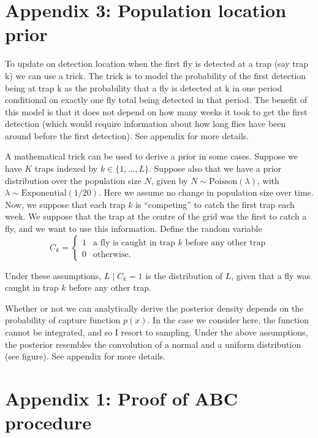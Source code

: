 \documentclass[
]{book}
\begin{document}
\hypertarget{appendix-3-population-location-prior}{%
\chapter{Appendix 3: Population location prior}\label{appendix-3-population-location-prior}}

To update on detection location when the first fly is detected at a trap (say trap k) we can use a trick. The trick is to model the probability of the first detection being at trap k as the probability that a fly is detected at k in one period conditional on exactly one fly total being detected in that period. The benefit of this model is that it does not depend on how many weeks it took to get the first detection (which would require information about how long flies have been around before the first detection). See appendix for more details.

A mathematical trick can be used to derive a prior in some cases. Suppose we have \(K\) traps indexed by \(k \in \{1, \ldots, L\}\). Suppose also that we have a prior distribution over the population size \(N\), given by \(N \sim \mathrm{Poisson} (\lambda)\), with \(\lambda \sim \mathrm{Exponential(1/20)}\). Here we assume no change in population size over time. Now, we suppose that each trap \(k\) is ``competing'' to catch the first trap each week. We suppose that the trap at the centre of the grid was the first to catch a fly, and we want to use this information. Define the random variable
\[
C_k = \begin{cases}1 & \text{a fly is caught in trap } k \text{ before any other trap} \\ 0 & \text{otherwise}. \end{cases}
\]

Under these assumptions, \(L \mid C_k = 1\) is the distribution of \(L\), given that a fly was caught in trap \(k\) before any other trap.

Whether or not we can analytically derive the posterior density depends on the probability of capture function \(p(x)\). In the case we consider here, the function cannot be integrated, and so I resort to sampling. Under the above assumptions, the posterior resembles the convolution of a normal and a uniform distribution (see figure). See appendix for more details.

\hypertarget{appendix-1-proof-of-abc-procedure-1}{%
\chapter{Appendix 1: Proof of ABC procedure}\label{appendix-1-proof-of-abc-procedure-1}}
\end{document}
